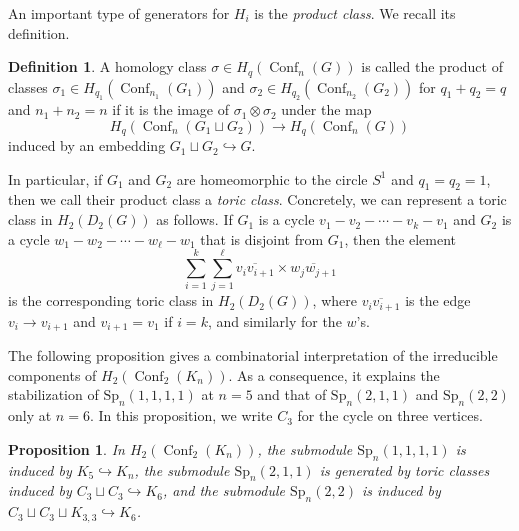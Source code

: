 \documentclass[12pt]{amsart}
\newtheorem{prop}[thm]{Proposition}
\theoremstyle{definition}
\newtheorem{defn}[thm]{Definition}
\newcommand{\conf}{\operatorname{Conf}}
\begin{document}
An important type of generators for $H_i$ is the \textit{product class}. We recall its definition.

\begin{defn}\cite[Definition 1.2]{CL}
    A homology class $\sigma\in H_q(\conf_n(G))$ is called the product of classes $\sigma_1\in H_{q_1}(\conf_{n_1}(G_1))$ and $\sigma_2\in H_{q_2}(\conf_{n_2}(G_2))$ for $q_1+q_2=q$ and $n_1+n_2=n$ if it is the image of $\sigma_1\otimes \sigma_2$ under the map \[H_q(\conf_n(G_1\sqcup G_2))\to H_q(\conf_n(G))\] induced by an embedding $G_1\sqcup G_2\hookrightarrow G$.
\end{defn}

In particular, if $G_1$ and $G_2$ are homeomorphic to the circle $S^1$ and $q_1=q_2=1$, then we call their product class a \textit{toric class}. Concretely, we can represent a toric class in $H_2(D_2(G))$ as follows. If $G_1$ is a cycle $v_1-v_2-\cdots-v_k-v_1$ and $G_2$ is a cycle $w_1-w_2-\cdots-w_\ell-w_1$ that is disjoint from $G_1$, then the element
\[\sum_{i=1}^k \sum_{j=1}^\ell \overline{v_iv_{i+1}}\times\overline{w_jw_{j+1}}\] is the corresponding toric class in $H_2(D_2(G))$, where $\overline{v_iv_{i+1}}$ is the edge $v_i\to v_{i+1}$ and $v_{i+1}=v_1$ if $i=k$, and similarly for the $w$'s.

The following proposition gives a combinatorial interpretation of the irreducible components of $H_2(\conf_2(K_n))$. As a consequence, it explains the stabilization of $\mathrm{Sp}_n(1,1,1,1)$ at $n=5$ and that of $\mathrm{Sp}_n(2,1,1)$ and $\mathrm{Sp}_n(2,2)$ only at $n=6$. In this proposition, we write $C_3$ for the cycle on three vertices.

\begin{prop}
    In $H_2(\conf_2(K_n))$, the submodule $\mathrm{Sp}_n(1,1,1,1)$ is induced by $K_5\hookrightarrow K_n$, the submodule $\mathrm{Sp}_n(2,1,1)$ is generated by toric classes induced by $C_3 \sqcup C_3\hookrightarrow K_6$, and the submodule $\mathrm{Sp}_n(2,2)$ is induced by $C_3\sqcup C_3 \sqcup K_{3,3}\hookrightarrow K_6$.
\end{prop}
\end{document}
